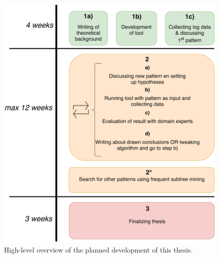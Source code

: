 \documentclass[a4paper,11pt]{article}
\begin{document}
\begin{figure}[H]
\centering
\includegraphics[width=.7\linewidth]{Planning.pdf}
\caption{High-level overview of the planned development of this thesis.}
\label{figure:planningOverview}
\end{figure}



\end{document}
